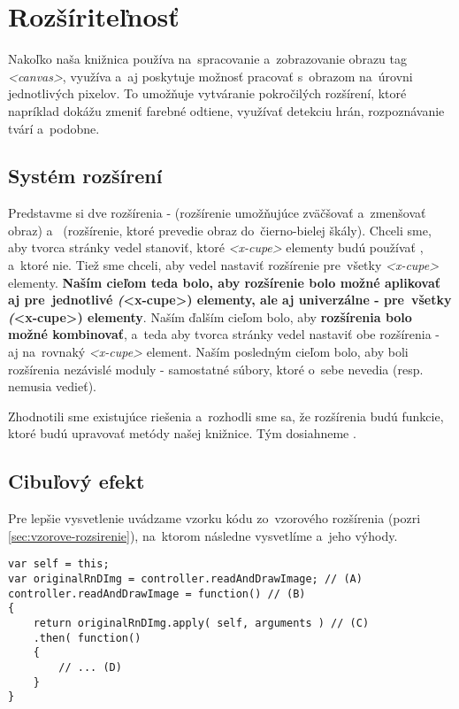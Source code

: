 \section{Rozšíriteľnosť}

Nakoľko naša knižnica používa na~spracovanie a~zobrazovanie obrazu tag \emph{<canvas>}, využíva a~aj poskytuje možnosť pracovať s~obrazom na~úrovni jednotlivých pixelov. To umožňuje vytváranie pokročilých rozšírení, ktoré napríklad dokážu zmeniť farebné odtiene, využívať detekciu hrán, rozpoznávanie tvárí a~podobne.

\subsection{Systém rozšírení}
\label{sec:system-rozsireni}

Predstavme si dve rozšírenia -  (rozšírenie umožňujúce zväčšovať a~zmenšovať obraz) a~ (rozšírenie, ktoré prevedie obraz do~čierno-bielej škály). Chceli sme, aby tvorca stránky vedel stanoviť, ktoré \emph{<x-cupe>} elementy budú používať , a~ktoré nie. Tiež sme chceli, aby vedel nastaviť rozšírenie  pre~všetky \emph{<x-cupe>} elementy. \textbf{Naším cieľom teda bolo, aby rozšírenie bolo možné aplikovať aj pre~jednotlivé \emph(<x-cupe>) elementy, ale aj univerzálne - pre~všetky \emph(<x-cupe>) elementy}. Naším ďalším cieľom bolo, aby \textbf{rozšírenia bolo možné kombinovať}, a~teda aby tvorca stránky vedel nastaviť obe rozšírenia -  aj  na~rovnaký \emph{<x-cupe>} element. Naším posledným cieľom bolo, aby boli rozšírenia nezávislé moduly - samostatné súbory, ktoré o~sebe nevedia (resp. nemusia vedieť).

Zhodnotili sme existujúce riešenia a~rozhodli sme sa, že rozšírenia budú funkcie, ktoré budú upravovať metódy našej knižnice. Tým dosiahneme .

\subsection{Cibuľový efekt}

Pre lepšie vysvetlenie uvádzame vzorku kódu zo~vzorového rozšírenia  (pozri \ref{sec:vzorove-rozsirenie}), na~ktorom následne vysvetlíme  a~jeho výhody.

\begin{lstlisting}[label=vytvaranie-cibuloveho-efektu,caption=Vytváranie cibuľového efektu.]
var self = this;
var originalRnDImg = controller.readAndDrawImage; // (A)
controller.readAndDrawImage = function() // (B)
{
    return originalRnDImg.apply( self, arguments ) // (C)
    .then( function()
    {
        // ... (D)
    }
}
\end{lstlisting}

